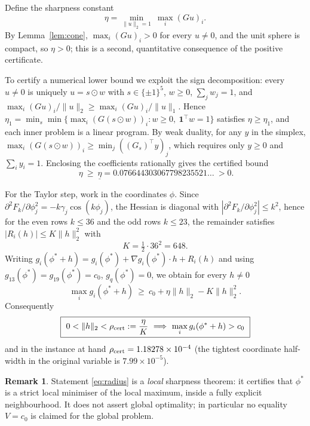 \documentclass[11pt]{article}
\theoremstyle{definition}
\newtheorem{remark}[theorem]{Remark}
\begin{document}
Define the sharpness constant
\begin{equation}\label{eq:eta}
\eta=\min_{\|u\|_2=1}\ \max_{i}(Gu)_i .
\end{equation}
By Lemma~\ref{lem:cone}, $\max_i(Gu)_i>0$ for every $u\neq0$, and the unit sphere is compact, so
$\eta>0$; this is a second, quantitative consequence of the positive certificate.

To certify a numerical lower bound we exploit the sign decomposition: every $u\neq0$ is uniquely
$u=s\odot w$ with $s\in\{\pm1\}^5$, $w\ge0$, $\sum_jw_j=1$, and $\max_i(Gu)_i/\|u\|_2\ge
\max_i(Gu)_i/\|u\|_1$. Hence $\eta_1=\min_s\min\{\max_i(G(s\odot w))_i: w\ge0,\ \mathbf{1}^{\top}w=1\}$
satisfies $\eta\ge\eta_1$, and each inner problem is a linear program. By weak duality, for any $y$ in
the simplex, $\max_i(G(s\odot w))_i\ge\min_j((G_s)^{\top}y)_j$, which requires only $y\ge0$ and
$\sum_iy_i=1$. Enclosing the coefficients rationally gives the certified bound
\begin{equation}\label{eq:etab}
\boxed{\ \eta\ \ge\ \underline{\eta}=0.076644303067798235521\ldots\ }>0 .
\end{equation}

For the Taylor step, work in the coordinates $\phi$. Since
$\partial^2F_k/\partial\phi_j^2=-k\gamma_j\cos(k\phi_j)$, the Hessian is diagonal with
$|\partial^2F_k/\partial\phi_j^2|\le k^2$, hence for the even rows $k\le36$ and the odd rows $k\le23$,
the remainder satisfies $|R_i(h)|\le K\|h\|_2^2$ with
\begin{equation}\label{eq:K}
K=\tfrac12\cdot 36^2=648 .
\end{equation}
Writing $g_i(\phi^\ast+h)=g_i(\phi^\ast)+\nabla g_i(\phi^\ast)\cdot h+R_i(h)$ and using
$g_{13}(\phi^\ast)=g_{19}(\phi^\ast)=c_0$, $g_q(\phi^\ast)=0$, we obtain for every $h\neq0$
\begin{equation}\label{eq:sharp}
\max_i g_i(\phi^\ast+h)\ \ge\ c_0+\eta\|h\|_2-K\|h\|_2^2 .
\end{equation}
Consequently
\begin{equation}\label{eq:radius}
\boxed{\ 0<\|h\|_2<\rho_{\rm cert}:=\frac{\eta}{K}\ \Longrightarrow\ \max_i g_i(\phi^\ast+h)>c_0\ }
\end{equation}
and in the instance at hand $\rho_{\rm cert}=1.18278\times10^{-4}$ (the tightest coordinate
half-width in the original variable is $7.99\times10^{-5}$).

\begin{remark}
Statement \eqref{eq:radius} is a \emph{local} sharpness theorem: it certifies that $\phi^\ast$ is a
strict local minimiser of the local maximum, inside a fully explicit neighbourhood. It does not assert
global optimality; in particular no equality $V=c_0$ is claimed for the global problem.
\end{remark}
\end{document}
